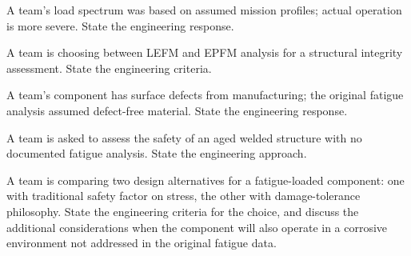 \begin{exercise}
A team's load spectrum was based on assumed mission profiles; actual operation is more severe. State the engineering response.
\end{exercise}

\begin{exercise}
A team is choosing between LEFM and EPFM analysis for a structural integrity assessment. State the engineering criteria.
\end{exercise}

\begin{exercise}
A team's component has surface defects from manufacturing; the original fatigue analysis assumed defect-free material. State the engineering response.
\end{exercise}

\begin{exercise}
A team is asked to assess the safety of an aged welded structure with no documented fatigue analysis. State the engineering approach.
\end{exercise}

\begin{exercise}
A team is comparing two design alternatives for a fatigue-loaded component: one with traditional safety factor on stress, the other with damage-tolerance philosophy. State the engineering criteria for the choice, and discuss the additional considerations when the component will also operate in a corrosive environment not addressed in the original fatigue data.
\end{exercise}
